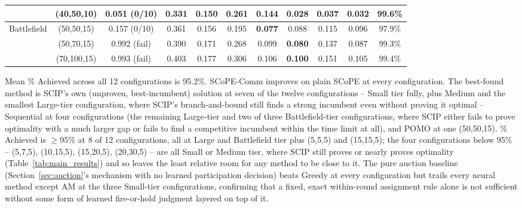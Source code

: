 \begin{table}[htbp]
\begin{tabular}{c|c|c|ccccccc|c}
                              & (40,50,10)  & 0.051 (0/10)  & 0.331 & 0.150 & 0.261 & 0.144 & \textbf{0.028} & 0.037 & 0.032 & 99.6\% \\ \hline
\multirow{3}{*}{Battlefield} & (50,50,15)  & 0.157 (0/10)  & 0.361 & 0.156 & 0.195 & \textbf{0.077} & 0.088 & 0.115 & 0.096 & 97.9\% \\
                              & (50,70,15)  & 0.992 (fail)  & 0.390 & 0.171 & 0.268 & 0.099 & \textbf{0.080} & 0.137 & 0.087 & 99.3\% \\
                              & (70,100,15) & 0.993 (fail)  & 0.403 & 0.177 & 0.306 & 0.106 & \textbf{0.100} & 0.151 & 0.105 & 99.4\% \\ \hline
\end{tabular}
\end{table}
Mean \% Achieved across all 12 configurations is 95.2\%. SCoPE-Comm improves on plain SCoPE at every configuration. The best-found method is SCIP's own (unproven, best-incumbent) solution at seven of the twelve configurations -- Small tier fully, plus Medium and the smallest Large-tier configuration, where SCIP's branch-and-bound still finds a strong incumbent even without proving it optimal -- Sequential at four configurations (the remaining Large-tier and two of three Battlefield-tier configurations, where SCIP either fails to prove optimality with a much larger gap or fails to find a competitive incumbent within the time limit at all), and POMO at one (50,50,15). \% Achieved is $\geq$95\% at 8 of 12 configurations, all at Large and Battlefield tier plus (5,5,5) and (15,15,5); the four configurations below 95\% -- (5,7,5), (10,15,5), (15,20,5), (20,30,5) -- are all Small or Medium tier, where SCIP still proves or nearly proves optimality (Table~\ref{tab:main_results}) and so leaves the least relative room for any method to be close to it. The pure auction baseline (Section~\ref{sec:auction}'s mechanism with no learned participation decision) beats Greedy at every configuration but trails every neural method except AM at the three Small-tier configurations, confirming that a fixed, exact within-round assignment rule alone is not sufficient without some form of learned fire-or-hold judgment layered on top of it.


